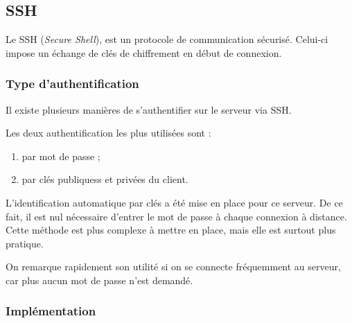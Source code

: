 \subsection{SSH}
\label{subsec:ssh}

Le SSH (\emph{Secure Shell}), est un protocole de communication
sécurisé. Celui-ci impose un échange de clés de chiffrement en début de
connexion.

\subsubsection{Type d'authentification}
\label{subsubsec:type-authentification}

Il existe plusieurs manières de s'authentifier sur le serveur via SSH.

Les deux authentification les plus utilisées sont :
\begin{enumerate}
\item par mot de passe ;
\item par clés publiquess et privées du client.
\end{enumerate}

L'identification automatique par clés a été mise en place pour ce serveur. De ce
fait, il est nul nécessaire d'entrer le mot de passe à chaque connexion à
distance. \\
Cette méthode est plus complexe à mettre en place, mais elle est surtout plus
pratique.

On remarque rapidement son utilité si on se connecte fréquemment au serveur, car
plus aucun mot de passe n'est demandé.

\subsubsection{Implémentation}
\label{subsubsec:implementation}


